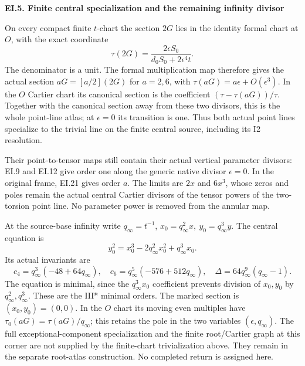 \par

\medskip\noindent\textbf{EI.5. Finite central specialization and the remaining infinity divisor}

\par\nobreak

On every compact finite \(t\)-chart the section \(2G\) lies in the
identity formal chart at \(O\), with the exact coordinate
\[
 \tau(2G)=
 \frac{2\epsilon S_0}{d_0S_0+2\epsilon^4t}.
 \tag{EI.28}
\]
The denominator is a unit. The formal multiplication map
therefore gives the actual section \(aG=[a/2](2G)\) for
\(a=2,6\), with \(\tau(aG)=a\epsilon+O(\epsilon^3)\).
In the \(O\) Cartier chart its canonical section is the
coefficient \((\tau-\tau(aG))/\tau\). Together with the
canonical section away from these two divisors, this is the
whole point-line atlas; at \(\epsilon=0\) its transition is
one. Thus both actual point lines specialize to the trivial
line on the finite central source, including its I2 resolution.

Their point-to-tensor maps still contain their actual vertical
parameter divisors: EI.9 and EI.12 give order one along the
generic native divisor \(\epsilon=0\). In the original frame,
EI.21 gives order \(a\). The limits are \(2x\) and \(6x^3\),
whose zeros and poles remain the actual central Cartier
divisors of the tensor powers of the two-torsion point line.
No parameter power is removed from the annular map.

At the source-base infinity write \(q_\infty=t^{-1}\),
\(x_0=q_\infty^2x,\ y_0=q_\infty^3y\). The central equation is
\[
 y_0^2=x_0^3-2q_\infty^2x_0^2+q_\infty^3x_0.
 \tag{EI.29}
\]
Its actual invariants are
\[
 c_4=q_\infty^3(-48+64q_\infty),\quad
 c_6=q_\infty^5(-576+512q_\infty),\quad
 \Delta=64q_\infty^9(q_\infty-1).
 \tag{EI.30}
\]
The equation is minimal, since the \(q_\infty^3x_0\) coefficient
prevents division of \(x_0,y_0\) by \(q_\infty^2,q_\infty^3\).
These are the III* minimal orders. The marked section is
\((x_0,y_0)=(0,0)\). In the \(O\) chart its moving even multiples
have \(\tau_0(aG)=\tau(aG)/q_\infty\); this retains the pole
in the two variables \((\epsilon,q_\infty)\).
The full exceptional-component specialization and the finite
root/Cartier graph at this corner are not supplied by the
finite-chart trivialization above. They remain in the separate
root-atlas construction. No completed return is assigned here.

\par

